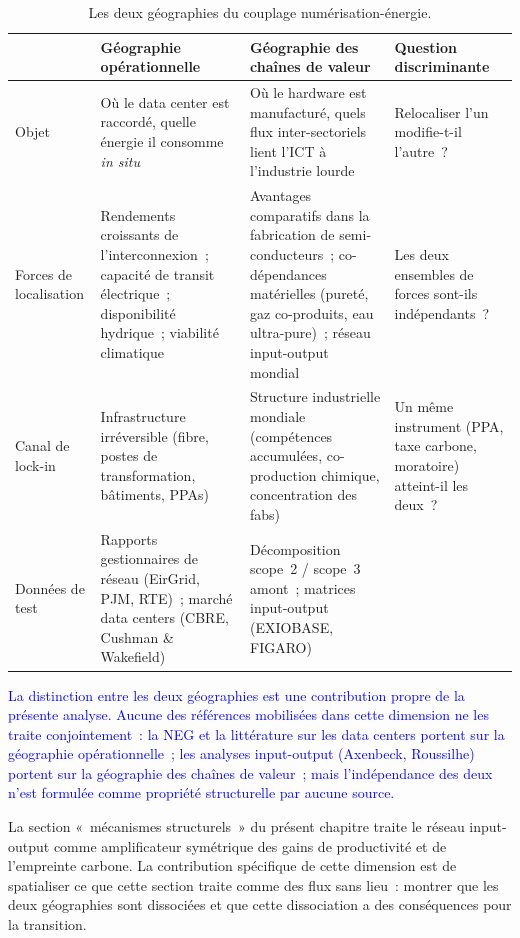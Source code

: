 \begin{table}[!ht]
\caption{Les deux géographies du couplage numérisation-énergie.}\label{tab:d9-geographies}
\centering\footnotesize
\renewcommand{\arraystretch}{1.25}
\begin{tabularx}{\textwidth}{@{}p{2.2cm}p{3.0cm}p{3.8cm}X@{}}
\toprule
 & \textbf{Géographie opérationnelle} & \textbf{Géographie des chaînes de valeur} & \textbf{Question discriminante} \\
\midrule
Objet & Où le data center est raccordé, quelle énergie il consomme \emph{in situ} & Où le hardware est manufacturé, quels flux inter-sectoriels lient l'ICT à l'industrie lourde & Relocaliser l'un modifie-t-il l'autre~? \\[4pt]
Forces de localisation & Rendements croissants de l'interconnexion~; capacité de transit électrique~; disponibilité hydrique~; viabilité climatique & Avantages comparatifs dans la fabrication de semi-conducteurs~; co-dépendances matérielles (pureté, gaz co-produits, eau ultra-pure)~; réseau input-output mondial & Les deux ensembles de forces sont-ils indépendants~? \\[4pt]
Canal de lock-in & Infrastructure irréversible (fibre, postes de transformation, bâtiments, PPAs) & Structure industrielle mondiale (compétences accumulées, co-production chimique, concentration des fabs) & Un même instrument (PPA, taxe carbone, moratoire) atteint-il les deux~? \\[4pt]
Données de test & Rapports gestionnaires de réseau (EirGrid, PJM, RTE)~; marché data centers (CBRE, Cushman \& Wakefield) & Décomposition scope~2 / scope~3 amont~; matrices input-output (EXIOBASE, FIGARO) & \\
\bottomrule
\end{tabularx}
\renewcommand{\arraystretch}{1.0}
\end{table}

\textcolor{blue}{La distinction entre les deux géographies est une contribution propre de la présente analyse. Aucune des références mobilisées dans cette dimension ne les traite conjointement~: la NEG et la littérature sur les data centers portent sur la géographie opérationnelle~; les analyses input-output (Axenbeck, Roussilhe) portent sur la géographie des chaînes de valeur~; mais l'indépendance des deux n'est formulée comme propriété structurelle par aucune source.}

La section «~mécanismes structurels~» du présent chapitre traite le réseau input-output comme amplificateur symétrique des gains de productivité et de l'empreinte carbone. La contribution spécifique de cette dimension est de spatialiser ce que cette section traite comme des flux sans lieu~: montrer que les deux géographies sont dissociées et que cette dissociation a des conséquences pour la transition.


